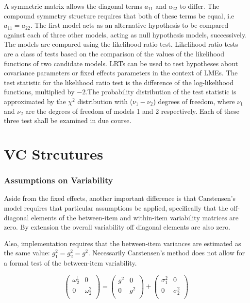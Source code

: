 \documentclass[12pt, a4paper]{report}
\theoremstyle{plain}
\theoremstyle{definition}
\theoremstyle{remark}
\begin{document}
	A symmetric matrix allows the diagonal terms $a_{11}$ and $a_{22}$ to differ. The compound symmetry structure requires that both of these terms be equal, i.e $a_{11} = a_{22}$. The first model acts as an alternative hypothesis to be compared against each of three other models, acting as null hypothesis models, successively. The models are compared using the likelihood ratio test. Likelihood ratio tests are a class of tests based on the comparison of the values of the likelihood functions of two candidate models. LRTs can be used to test hypotheses about covariance parameters or fixed effects parameters in the context of LMEs. The test statistic for the likelihood ratio test is the difference of the log-likelihood functions, multiplied by $-2$.The probability distribution of the test statistic is approximated by the $\chi^2$ distribution with ($\nu_{1} - \nu_{2}$) degrees of freedom, where $\nu_{1}$ and $\nu_{2}$ are the degrees of freedom of models 1 and 2 respectively. Each of these three test shall be examined in due course.
	
	
	
	
	\newpage
	
	
	
\chapter{VC Strcutures}	
	\subsection{Assumptions on Variability}
	
	Aside from the fixed effects, another important difference is that Carstensen's model requires that particular assumptions be applied, specifically that the off-diagonal elements of the between-item
	and within-item variability matrices are zero. By extension the
	overall variability off diagonal elements are also zero.
	
	Also, implementation requires that the between-item variances are
	estimated as the same value: $g^2_1 = g^2_2 = g^2$. Necessarily
	Carstensen's method does not allow for a formal test of the
	between-item variability.
	
	\[\left(\begin{array}{cc}
	\omega^1_2  & 0 \\
	0 & \omega^2_2 \\
	\end{array}  \right)
	=  \left(
	\begin{array}{cc}
	g^2  & 0 \\
	0 & g^2 \\
	\end{array} \right)+
	\left(
	\begin{array}{cc}
	\sigma^2_1  & 0 \\
	0 & \sigma^2_2 \\
	\end{array}\right)
	\]
	
\end{document}

